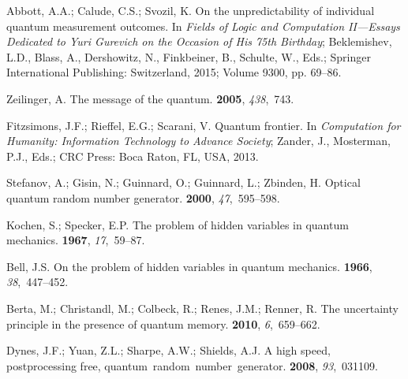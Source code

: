 \documentclass[information,article,accept,moreauthors,pdftex,12pt,a4paper]{mdpi}
\theoremstyle{mdpi}
\newcounter{ex}
\newcounter{re}
\theoremstyle{mdpidefinition}
\begin{document}
\begin{thebibliography}{----}
\providecommand{\natexlab}[1]{#1}

Abbott, A.A.; Calude, C.S.; Svozil, K.
 On the unpredictability of individual quantum measurement outcomes. In {\em Fields of Logic and Computation {II}---Essays Dedicated to Yuri Gurevich on the Occasion of His 75th Birthday}; Beklemishev, L.D., Blass, A., Dershowitz, N., Finkbeiner, B., Schulte, W., Eds.; Springer International Publishing: Switzerland, 2015; Volume 9300, pp. 69--86.

Zeilinger, A.
\newblock The message of the quantum.
 {\bf 2005}, {\em 438},~743.

Fitzsimons, J.F.; Rieffel, E.G.; Scarani, V.
\newblock Quantum frontier. In {\em Computation for Humanity: Information
 Technology to Advance Society}; Zander, J., Mosterman, P.J., Eds.; CRC Press: Boca Raton, FL, USA, 2013.

Stefanov, A.; Gisin, N.; Guinnard, O.; Guinnard, L.; Zbinden, H.
\newblock Optical quantum random number generator.
 {\bf 2000}, {\em 47},~595--598.

Kochen, S.; Specker, E.P.
\newblock The problem of hidden variables in quantum mechanics.
 {\bf 1967}, {\em 17},~59--87.

Bell, J.S.
\newblock On the problem of hidden variables in quantum mechanics.
 {\bf 1966}, {\em 38},~447--452.

Berta, M.; Christandl, M.; Colbeck, R.; Renes, J.M.; Renner, R.
\newblock The uncertainty principle in the presence of quantum memory.
 {\bf 2010}, {\em 6},~659--662.

Dynes, J.F.; Yuan, Z.L.; Sharpe, A.W.; Shields, A.J.
\newblock A high speed, postprocessing free, \mbox{quantum random number generator}.
 {\bf 2008}, {\em 93},~031109.


\end{thebibliography}
\end{document}
